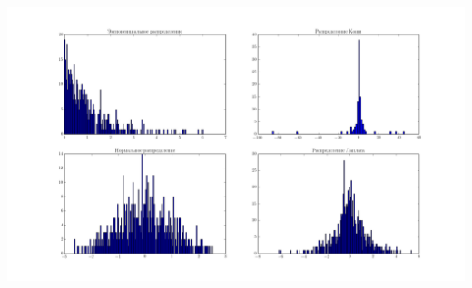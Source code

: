 \documentclass[a4paper,12pt]{article}
\begin{document}


\includegraphics[trim=3cm 0 0 -0.5cm, height = 16 cm, width =  19 cm]{gistorramm.png}
\end{document}
